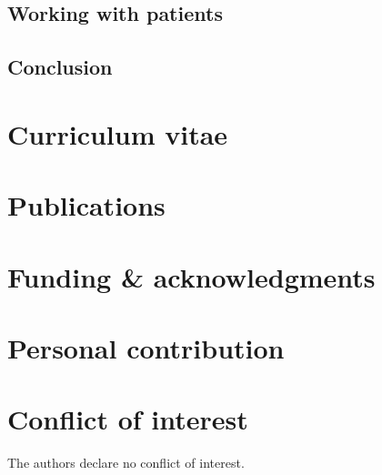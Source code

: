 \section{Working with patients}
\section{Conclusion}



\appendix
\backmatter
\chapter{Curriculum vitae}
\chapter{Publications}
\chapter{Funding \& acknowledgments}
\lipsum[1]
\chapter{Personal contribution}
\lipsum[2]
\chapter{Conflict of interest}
The authors declare no conflict of interest.

